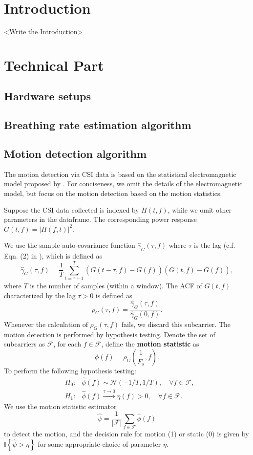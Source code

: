 
\section{Introduction}
<Write the Introduction>

\section{Technical Part}

\subsection{
    Hardware setups
}

\subsection{
    Breathing rate estimation algorithm
}

\subsection{
    Motion detection algorithm
}

The motion detection via CSI data is based on the statistical electromagnetic model proposed by \cite{LaowuMotionStatistics2019}. For conciseness, we omit the details of the electromagnetic model, but focus on the motion detection based on the motion statistics. 
\par Suppose the CSI data collected is indexed by $H(t, f)$, while we omit other parameters in the dataframe. The corresponding power response $G(t, f) = |H(f, t)|^2$. 
\par We use the sample auto-covariance function $\hat{\gamma}_G(\tau, f)$ where $\tau$ is the lag (c.f. Eqn. (2) in \cite{LaowuMotionStatistics2019}), which is defined as 
$$
\hat{\gamma}_G(\tau, f) = \frac{1}{T} \sum_{t = \tau+1}^{T} (G(t-\tau, f) - \overline{G}(f))(G(t, f) - \overline{G}(f)),
$$
where $T$ is the number of samples (within a window). The ACF of $G(t, f)$ characterized by the lag $\tau > 0$ is defined as
$$
\rho_{G}(\tau, f) = \frac{\hat{\gamma}_G(\tau, f)}{\hat{\gamma}_G(0, f)}.
$$
Whenever the calculation of $\rho_{G}(\tau, f)$ fails, we discard this subcarrier.
The motion detection is performed by hypothesis testing. Denote the set of subcarriers as $\mathcal{F}$, for each $f \in \mathcal{F}$, define the \textbf{motion statistic} as 
$$
\phi(f) = \rho_G\left(\frac{1}{F_s}, f \right).
$$
To perform the following hypothesis testing:
$$
\begin{aligned}
    &H_0: & \hat{\phi}(f) \sim \mathcal{N}(-1/T, 1/T), \quad \forall f \in \mathcal{F}, \\
    &H_1: &\hat{\phi}(f) \xrightarrow{\tau \to 0} \eta(f) > 0, \quad \forall f \in \mathcal{F}.
\end{aligned}
$$
We use the motion statistic estimator
$$
\hat{\psi} = \frac{1}{|\mathcal{F}|} \sum_{f \in \mathcal{F}} \hat{\phi}(f)
$$
to detect the motion, and the decision rule for motion (1) or static (0) is given by $\mathbb{I}\left\{ \hat{\psi} > \eta  \right\}$ for some appropriate choice of parameter $\eta$.






